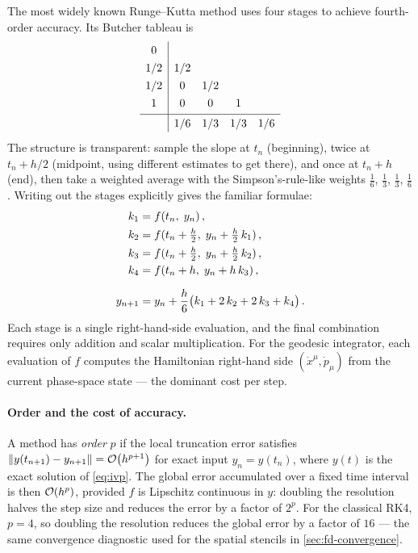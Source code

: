 The most widely known Runge--Kutta method uses four stages to achieve
fourth-order accuracy.  Its Butcher tableau is
%
\begin{equation}
  \renewcommand{\arraystretch}{1.3}
  \begin{array}{c|cccc}
    0   &     &     &     & \\
    1/2 & 1/2 &     &     & \\
    1/2 & 0   & 1/2 &     & \\
    1   & 0   & 0   & 1   & \\[2pt]
    \hline
        & 1/6 & 1/3 & 1/3 & 1/6
  \end{array}
  \label{eq:rk4-tableau}
\end{equation}
%
The structure is transparent: sample the slope at $t_n$
(beginning), twice at $t_n + h/2$ (midpoint, using different
estimates to get there), and once at $t_n + h$ (end), then
take a weighted average with the Simpson's-rule-like
weights $\frac{1}{6}$, $\frac{1}{3}$, $\frac{1}{3}$,
$\frac{1}{6}$.  Writing out the stages explicitly gives the
familiar formulae:
%
\begin{align}
  k_1 &= f(t_n,\; y_n) \,, \notag \\
  k_2 &= f(t_n + \tfrac{h}{2},\; y_n + \tfrac{h}{2}\,k_1) \,, \notag \\
  k_3 &= f(t_n + \tfrac{h}{2},\; y_n + \tfrac{h}{2}\,k_2) \,,
  \label{eq:rk4-stages} \\
  k_4 &= f(t_n + h,\; y_n + h\,k_3) \,, \notag \\[6pt]
  y_{n+1} &= y_n + \frac{h}{6}\bigl(k_1 + 2\,k_2 + 2\,k_3 + k_4\bigr) \,.
  \notag
\end{align}
%
Each stage is a single right-hand-side evaluation, and the final
combination requires only addition and scalar multiplication.
For the geodesic integrator, each evaluation of $f$ computes the
Hamiltonian right-hand side $(\dot{x}^\mu, \dot{p}_\mu)$ from the
current phase-space state --- the dominant cost per step.

\paragraph{Order and the cost of accuracy.}

A method has \emph{order} $p$ if the local truncation error satisfies
$\left\lVert y(t_{n+1}) - y_{n+1} \right\rVert = \mathcal{O}\!\left(h^{p+1}\right)$ for exact input
$y_n = y(t_n)$, where $y(t)$ is the exact solution of
\cref{eq:ivp}.  The global error accumulated over a fixed time
interval is then $\mathcal{O}\!\left(h^p\right)$, provided $f$ is Lipschitz continuous
in $y$: doubling the resolution halves the step size and reduces the
error by a factor of $2^p$.
For the classical RK4, $p = 4$, so doubling the resolution reduces
the global error by a factor of $16$ --- the same convergence
diagnostic used for the spatial stencils in
\cref{sec:fd-convergence}.

